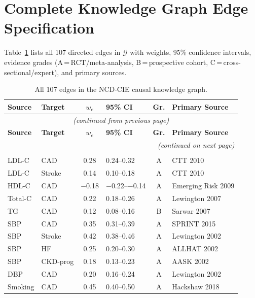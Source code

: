 \documentclass[runningheads]{llncs}
\begin{document}
\clearpage
\appendix
\section{Complete Knowledge Graph Edge Specification}\label{app:edges}

Table~\ref{tab:edges} lists all 107 directed edges in $\mathcal{G}$
with weights, 95\% confidence intervals, evidence grades (A\,=\,RCT/meta-analysis,
B\,=\,prospective cohort, C\,=\,cross-sectional/expert), and primary sources.

{\footnotesize
\renewcommand{\arraystretch}{1.05}
\begin{longtable}{@{}p{2.0cm}p{2.0cm}cp{1.4cm}cp{2.8cm}@{}}
\caption{All 107 edges in the NCD-CIE causal knowledge graph.}\label{tab:edges}\\
\toprule
\textbf{Source} & \textbf{Target} & \textbf{$w_e$} & \textbf{95\% CI} & \textbf{Gr.} & \textbf{Primary Source} \\
\midrule
\endfirsthead
\multicolumn{6}{c}{\small\itshape (continued from previous page)} \\
\toprule
\textbf{Source} & \textbf{Target} & \textbf{$w_e$} & \textbf{95\% CI} & \textbf{Gr.} & \textbf{Primary Source} \\
\midrule
\endhead
\midrule
\multicolumn{6}{r}{\small\itshape (continued on next page)} \\
\endfoot
\bottomrule
\endlastfoot
\multicolumn{6}{l}{\textbf{CVD Domain (38 edges)}} \\
\midrule
LDL-C & CAD & 0.28 & 0.24--0.32 & A & CTT 2010 \\
LDL-C & Stroke & 0.14 & 0.10--0.18 & A & CTT 2010 \\
HDL-C & CAD & $-$0.18 & $-$0.22--$-$0.14 & A & Emerging Risk 2009 \\
Total-C & CAD & 0.22 & 0.18--0.26 & A & Lewington 2007 \\
TG & CAD & 0.12 & 0.08--0.16 & B & Sarwar 2007 \\
SBP & CAD & 0.35 & 0.31--0.39 & A & SPRINT 2015 \\
SBP & Stroke & 0.42 & 0.38--0.46 & A & Lewington 2002 \\
SBP & HF & 0.25 & 0.20--0.30 & A & ALLHAT 2002 \\
SBP & CKD-prog & 0.18 & 0.13--0.23 & A & AASK 2002 \\
DBP & CAD & 0.20 & 0.16--0.24 & A & Lewington 2002 \\
Smoking & CAD & 0.45 & 0.40--0.50 & A & Hackshaw 2018 \\

\end{longtable}}
\end{document}
